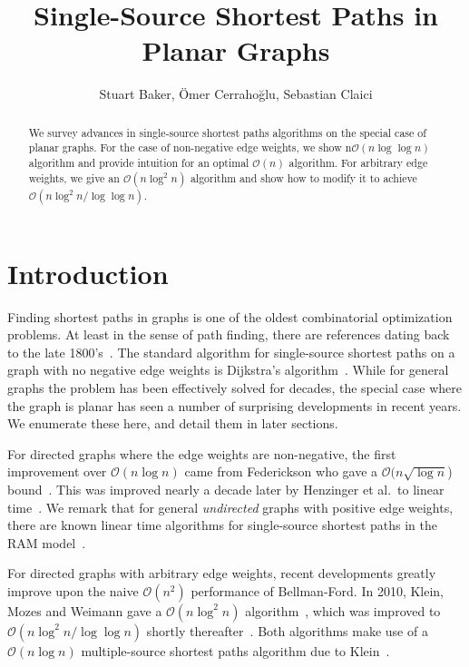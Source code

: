 \documentclass[11pt]{article}
\title{Single-Source Shortest Paths in Planar Graphs}
\author{Stuart Baker, \"{O}mer Cerraho\u{g}lu, Sebastian Claici}
\date{}
\begin{document}
\maketitle

\begin{abstract}

  We survey advances in single-source shortest paths algorithms on the special case of planar graphs. For the case of non-negative edge weights, we show n$\mathcal{O}(n\log \log n)$ algorithm and provide intuition for an optimal $\mathcal{O}(n)$ algorithm. For arbitrary edge weights, we give an $\mathcal{O}(n\log^2 n)$ algorithm and show how to modify it to achieve $\mathcal{O}(n\log^2 n/\log \log n)$.

\end{abstract}

\section{Introduction}
\label{sec:introduction}

Finding shortest paths in graphs is one of the oldest combinatorial optimization problems. At least in the sense of path finding, there are references dating back to the late 1800's~\cite{wiener1873ueber}. The standard algorithm for single-source shortest paths on a graph with no negative edge weights is Dijkstra's algorithm~\cite{dijkstra1959note}. While for general graphs the problem has been effectively solved for decades, the special case where the graph is planar has seen a number of surprising developments in recent years. We enumerate these here, and detail them in later sections.

For directed graphs where the edge weights are non-negative, the first improvement over $\mathcal{O}(n\log n)$ came from Federickson who gave a $\mathcal{O}(n \sqrt{\log n}$) bound~\cite{federickson1987fast}. This was improved nearly a decade later by Henzinger et al.\ to linear time~\cite{henzinger1997faster}. We remark that for general \emph{undirected} graphs with positive edge weights, there are known linear time algorithms for single-source shortest paths in the RAM model~\cite{thorup1999undirected}.

For directed graphs with arbitrary edge weights, recent developments greatly improve upon the naive $\mathcal{O}(n^2)$ performance of Bellman-Ford. In 2010, Klein, Mozes and Weimann gave a $\mathcal{O}(n \log^2 n)$ algorithm~\cite{klein2010shortest}, which was improved to $\mathcal{O}(n \log^2 n / \log \log n)$ shortly thereafter~\cite{mozes2010shortest}. Both algorithms make use of a $\mathcal{O}(n \log n)$ multiple-source shortest paths algorithm due to Klein~\cite{klein2005multiple}.
\end{document}
